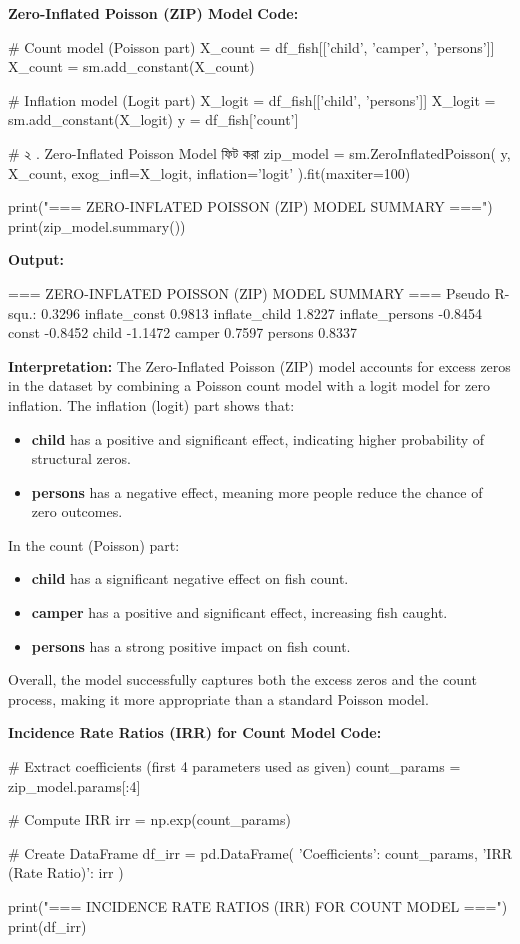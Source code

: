 \documentclass[12pt,a4paper]{article}
\begin{document}
\textbf{Zero-Inflated Poisson (ZIP) Model}
\textbf{Code:}
\begin{codebox}
# Count model (Poisson part)
X_count = df_fish[['child', 'camper', 'persons']]
X_count = sm.add_constant(X_count)

# Inflation model (Logit part)
X_logit = df_fish[['child', 'persons']]
X_logit = sm.add_constant(X_logit)
y = df_fish['count']

# ২ . Zero-Inflated Poisson Model ফিট করা
zip_model = sm.ZeroInflatedPoisson(
    y, X_count,
    exog_infl=X_logit,
    inflation='logit'
).fit(maxiter=100)

print("\n=== ZERO-INFLATED POISSON (ZIP) MODEL SUMMARY ===")
print(zip_model.summary())
\end{codebox}

\textbf{Output:}
\begin{codebox}
=== ZERO-INFLATED POISSON (ZIP) MODEL SUMMARY ===
Pseudo R-squ.: 0.3296
inflate_const 0.9813
inflate_child 1.8227
inflate_persons -0.8454
const -0.8452
child -1.1472
camper 0.7597
persons 0.8337
\end{codebox}

\textbf{Interpretation:}
The Zero-Inflated Poisson (ZIP) model accounts for excess zeros in the dataset by combining a Poisson count model with a logit model for zero inflation.
The inflation (logit) part shows that:
\begin{itemize}
\item \textbf{child} has a positive and significant effect, indicating higher probability of structural zeros.
\item \textbf{persons} has a negative effect, meaning more people reduce the chance of zero outcomes.
\end{itemize}
In the count (Poisson) part:
\begin{itemize}
\item \textbf{child} has a significant negative effect on fish count.
\item \textbf{camper} has a positive and significant effect, increasing fish caught.
\item \textbf{persons} has a strong positive impact on fish count.
\end{itemize}
Overall, the model successfully captures both the excess zeros and the count process, making it more appropriate than a standard Poisson model.

\textbf{Incidence Rate Ratios (IRR) for Count Model}
\textbf{Code:}
\begin{codebox}
# Extract coefficients (first 4 parameters used as given)
count_params = zip_model.params[:4]

# Compute IRR
irr = np.exp(count_params)

# Create DataFrame
df_irr = pd.DataFrame({
    'Coefficients': count_params,
    'IRR (Rate Ratio)': irr
})

print("=== INCIDENCE RATE RATIOS (IRR) FOR COUNT MODEL ===")
print(df_irr)
\end{codebox}
\end{document}
